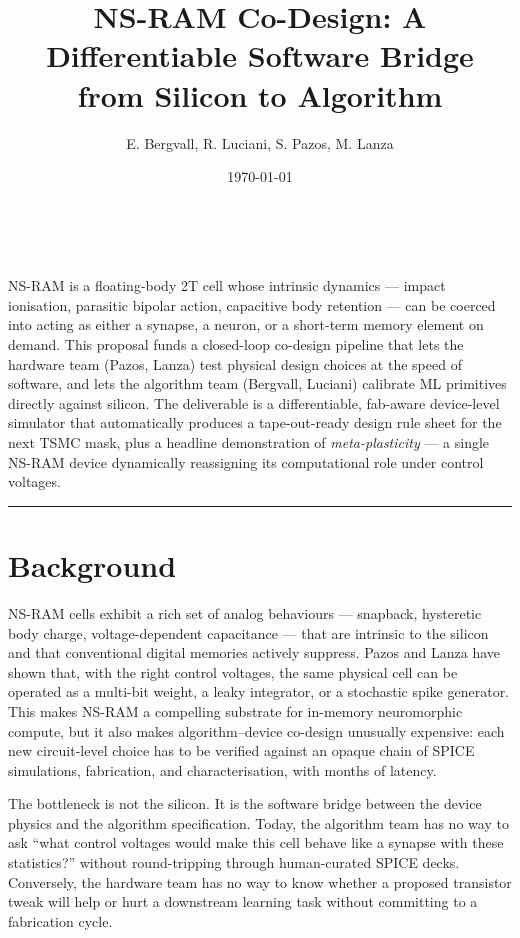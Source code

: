 \documentclass[fontsize=10pt]{article}
\title{
\Large NS-RAM Co-Design: A Differentiable Software Bridge from Silicon to Algorithm \\
[10pt]
}
\date{\today}
\author{E. Bergvall, R. Luciani, S. Pazos, M. Lanza}
\makeatletter
\renewenvironment{abstract}
 {\small
  \begin{center}
  \bfseries \abstractname\vspace{-.5em}\vspace{0pt}
  \end{center}
  \list{}{%
    \setlength{\leftmargin}{0mm}
    \setlength{\rightmargin}{\leftmargin}%
  }
  \item\relax}
 {\endlist}
\renewcommand{\maketitle}{\bgroup\setlength{\parindent}{0pt}
\begin{flushleft}
  \textbf{\@title}
  \@author \\
  \@date
\end{flushleft}\egroup
}
\makeatother
\begin{document}
 \maketitle

\begin{abstract}
NS-RAM is a floating-body 2T cell whose intrinsic dynamics --- impact ionisation, parasitic
bipolar action, capacitive body retention --- can be coerced into acting as either a synapse,
a neuron, or a short-term memory element on demand. This proposal funds a closed-loop
co-design pipeline that lets the hardware team (Pazos, Lanza) test physical design choices
at the speed of software, and lets the algorithm team (Bergvall, Luciani) calibrate
ML primitives directly against silicon. The deliverable is a differentiable, fab-aware
device-level simulator that automatically produces a tape-out-ready design rule sheet for
the next TSMC mask, plus a headline demonstration of \emph{meta-plasticity} --- a single
NS-RAM device dynamically reassigning its computational role under control voltages.
\end{abstract}

\rule{\linewidth}{0.5pt}


\section{Background}
NS-RAM cells exhibit a rich set of analog behaviours --- snapback, hysteretic body charge,
voltage-dependent capacitance --- that are intrinsic to the silicon and that conventional
digital memories actively suppress. Pazos and Lanza have shown that, with the right control
voltages, the same physical cell can be operated as a multi-bit weight, a leaky integrator,
or a stochastic spike generator. This makes NS-RAM a compelling substrate for in-memory
neuromorphic compute, but it also makes algorithm--device co-design unusually expensive:
each new circuit-level choice has to be verified against an opaque chain of SPICE
simulations, fabrication, and characterisation, with months of latency.

The bottleneck is not the silicon. It is the software bridge between the device physics
and the algorithm specification. Today, the algorithm team has no way to ask
``what control voltages would make this cell behave like a synapse with these statistics?''
without round-tripping through human-curated SPICE decks. Conversely, the hardware team has
no way to know whether a proposed transistor tweak will help or hurt a downstream learning
task without committing to a fabrication cycle.
\end{document}
